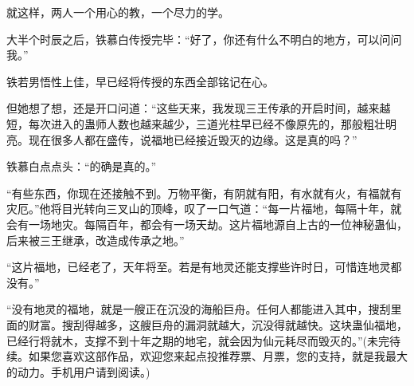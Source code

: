 \begin{this_body}
就这样，两人一个用心的教，一个尽力的学。

大半个时辰之后，铁慕白传授完毕：“好了，你还有什么不明白的地方，可以问问我。”

铁若男悟性上佳，早已经将传授的东西全部铭记在心。

但她想了想，还是开口问道：“这些天来，我发现三王传承的开启时间，越来越短，每次进入的蛊师人数也越来越少，三道光柱早已经不像原先的，那般粗壮明亮。现在很多人都在盛传，说福地已经接近毁灭的边缘。这是真的吗？”

铁慕白点点头：“的确是真的。”

“有些东西，你现在还接触不到。万物平衡，有阴就有阳，有水就有火，有福就有灾厄。”他将目光转向三叉山的顶峰，叹了一口气道：“每一片福地，每隔十年，就会有一场地灾。每隔百年，都会有一场天劫。这片福地源自上古的一位神秘蛊仙，后来被三王继承，改造成传承之地。”

“这片福地，已经老了，天年将至。若是有地灵还能支撑些许时日，可惜连地灵都没有。”

“没有地灵的福地，就是一艘正在沉没的海船巨舟。任何人都能进入其中，搜刮里面的财富。搜刮得越多，这艘巨舟的漏洞就越大，沉没得就越快。这块蛊仙福地，已经行将就木，支撑不到十年之期的地宅，就会因为仙元耗尽而毁灭的。”(未完待续。如果您喜欢这部作品，欢迎您来起点投推荐票、月票，您的支持，就是我最大的动力。手机用户请到阅读。)

\end{this_body}

